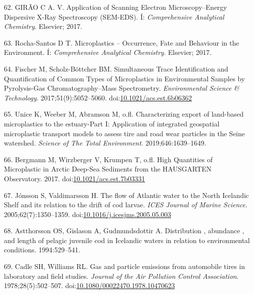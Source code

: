 \documentclass[icelandic,]{book}
\begin{document}
\leavevmode\hypertarget{ref-bitam2014bio2}{}%
62. GIRÃO C A. V. Application of Scanning Electron Microscopy--Energy Dispersive X-Ray Spectroscopy (SEM-EDS). Í: \emph{Comprehensive Analytical Chemistry}. Elsevier; 2017.

\leavevmode\hypertarget{ref-k22014bio2}{}%
63. Rocha-Santos D T. Microplastics -- Occurrence, Fate and Behaviour in the Environment. Í: \emph{Comprehensive Analytical Chemistry}. Elsevier; 2017.

\leavevmode\hypertarget{ref-Fischer2017}{}%
64. Fischer M, Scholz-Böttcher BM. Simultaneous Trace Identification and Quantification of Common Types of Microplastics in Environmental Samples by Pyrolysis-Gas Chromatography--Mass Spectrometry. \emph{Environmental Science \& Technology}. 2017;51(9):5052--5060. doi:\href{https://doi.org/10.1021/acs.est.6b06362}{10.1021/acs.est.6b06362}

\leavevmode\hypertarget{ref-unice2019characterizing1}{}%
65. Unice K, Weeber M, Abramson M, o.fl. Characterizing export of land-based microplastics to the estuary-Part I: Application of integrated geospatial microplastic transport models to assess tire and road wear particles in the Seine watershed. \emph{Science of The Total Environment}. 2019;646:1639--1649.

\leavevmode\hypertarget{ref-Bergmann2017}{}%
66. Bergmann M, Wirzberger V, Krumpen T, o.fl. High Quantities of Microplastic in Arctic Deep-Sea Sediments from the HAUSGARTEN Observatory. 2017. doi:\href{https://doi.org/10.1021/acs.est.7b03331}{10.1021/acs.est.7b03331}

\leavevmode\hypertarget{ref-Strait2005a}{}%
67. Jónsson S, Valdimarsson H. The flow of Atlantic water to the North Icelandic Shelf and its relation to the drift of cod larvae. \emph{ICES Journal of Marine Science}. 2005;62(7):1350--1359. doi:\href{https://doi.org/10.1016/j.icesjms.2005.05.003}{10.1016/j.icesjms.2005.05.003}

\leavevmode\hypertarget{ref-Astthorsson1994}{}%
68. Astthorsson OS, Gislason A, Gudmundsdottir A. Distribution , abundance , and length of pelagic juvenile cod in Icelandic waters in relation to environmental conditions. 1994:529--541.

\leavevmode\hypertarget{ref-Cadle1978}{}%
69. Cadle SH, Williams RL. Gas and particle emissions from automobile tires in laboratory and field studies. \emph{Journal of the Air Pollution Control Association}. 1978;28(5):502--507. doi:\href{https://doi.org/10.1080/00022470.1978.10470623}{10.1080/00022470.1978.10470623}
\end{document}

